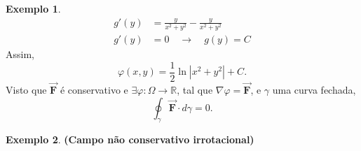 \documentclass[11pt]{article}
\theoremstyle{definition}
\newtheorem{exemplo}{Exemplo}[subsection]
\begin{document}
\begin{exemplo}
\begin{align*}
			g'(y)&=\frac{y}{x^2+y^2}-\frac{y}{x^2+y^2}\\
			g'(y)&=0 \quad\longrightarrow\quad g(y)=C
		\end{align*}
		Assim,
		\begin{equation*}
			\varphi(x,y)=\frac{1}{2}\ln |x^2+y^2|+C.
		\end{equation*}
		Visto que $\vec{\boldsymbol{F}}$ é conservativo e $\exists\varphi:\Omega \to \mathbb{R}$, tal que $\nabla\varphi=\vec{\boldsymbol{F}}$, e $\gamma$ uma curva fechada,
		\begin{equation*}
			\oint_{\gamma}\vec{\boldsymbol{F}}\cdot d\gamma=0.
		\end{equation*}
	\end{exemplo}

	\begin{exemplo}
		\textbf{(Campo não conservativo irrotacional)}
		

\end{exemplo}
\end{document}
